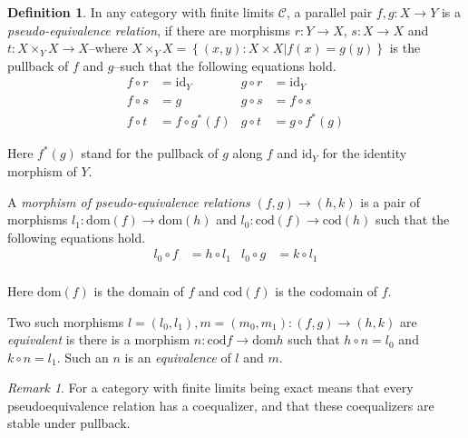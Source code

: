 \documentclass[sort&compress,draft]{elsarticle}
\theoremstyle{plain}
\theoremstyle{definition}
\newtheorem{definition}[theorem]{Definition}
\theoremstyle{remark}
\newtheorem{remark}[theorem]{Remark}
\newcommand\key[1]{\emph{#1}\label{#1}}
\newcommand\cat\mathcal
\newcommand\set[1]{\left\{#1\right\}}
\newcommand\of:
\newcommand\ri{^*}
\newcommand\id{\mathrm{id}}
\newcommand\dom{\mathrm{dom}}
\newcommand\cod{\mathrm{cod}}
\begin{document}
\begin{definition} In any category with finite limits $\cat C$, a parallel pair $f,g\of X\to Y$ is a \key{pseudo-equivalence relation}, if there are morphisms $r:Y\to X$, $s:X\to X$ and $t:X\times_YX \to X$--where $X\times_YX = \set{(x,y)\of X\times X|f(x)=g(y)}$ is the pullback of $f$ and $g$--such that the following equations hold.
\begin{align*}
f\circ r &=\id_Y & g\circ r &= \id_Y\\
f\circ s &= g & g\circ s &= f\circ s\\
f\circ t &= f\circ g\ri(f) & g\circ t &= g\circ f\ri(g)
\end{align*}

Here $f\ri(g)$ stand for the pullback of $g$ along $f$ and $\id_Y$ for the identity morphism of $Y$.

A \emph{morphism of pseudo-equivalence relations} $(f,g) \to (h,k)$ is a pair of morphisms $l_1\of \dom(f) \to \dom(h)$ and $l_0\of \cod(f) \to \cod(h)$ such that the following equations hold.
\begin{align*}
l_0\circ f &= h\circ l_1 & l_0\circ g &= k\circ l_1\\
\end{align*}

Here $\dom(f)$ is the domain of $f$ and $\cod(f)$ is the codomain of $f$.

Two such morphisms $l=(l_0,l_1),m=(m_0,m_1):(f,g) \to (h,k)$ are \emph{equivalent} is there is a morphism $n\of \cod f \to \dom h$ such that $h\circ n = l_0$ and $k\circ n = l_1$. Such an $n$ is an \emph{equivalence} of $l$ and $m$.
\end{definition}

\begin{remark} For a category with finite limits being exact means that every pseudoequivalence relation has a coequalizer, and that these coequalizers are stable under pullback.
\end{remark}
\end{document}
